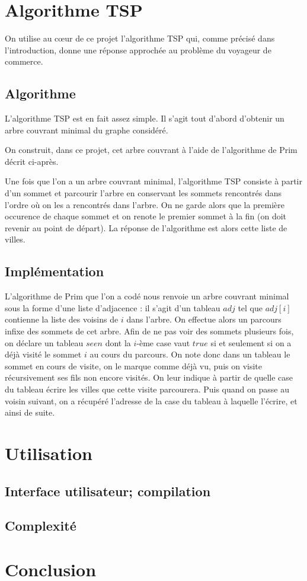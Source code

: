 \documentclass{article}
\begin{document}
\section{Algorithme TSP}
On utilise au c\oe ur de ce projet l'algorithme TSP qui, comme précisé dans l'introduction, donne une réponse approchée au problème du voyageur de commerce.

\subsection{Algorithme}
L'algorithme TSP est en fait assez simple. Il s'agit tout d'abord d'obtenir un arbre couvrant minimal du graphe considéré.


On construit, dans ce projet, cet arbre couvrant à l'aide de l'algorithme de Prim décrit ci-après.

Une fois que l'on a un arbre couvrant minimal, l'algorithme TSP consiste à partir d'un sommet et parcourir l'arbre en conservant les sommets rencontrés dans l'ordre où 
on les a rencontrés dans l'arbre. On ne garde alors que la première occurence de chaque sommet et on renote le premier sommet à la fin (on doit revenir au point de 
départ). La réponse de l'algorithme est alors cette liste de villes.

\subsection{Implémentation}
L'algorithme de Prim que l'on a codé nous renvoie un arbre couvrant minimal sous la forme d'une liste d'adjacence : il s'agit d'un tableau $adj$ tel que
$adj[i]$ contienne la liste des voisins de $i$ dans l'arbre.
On effectue alors un parcours infixe
des sommets de cet arbre. Afin de ne pas voir des sommets plusieurs fois, on déclare un tableau $seen$ dont la $i$-ème case vaut $true$ si et seulement si on a déjà
visité le sommet $i$ au cours du parcours. On note donc dans un tableau le sommet en cours de visite, on le marque comme déjà vu, puis on visite récursivement ses 
fils non encore visités. On leur indique à partir de quelle case du tableau écrire les villes que cette visite parcourera. Puis quand on passe au voisin suivant, on a
récupéré l'adresse de la case du tableau à laquelle l'écrire, et ainsi de suite.



\section{Utilisation}

\subsection{Interface utilisateur; compilation}

\subsection{Complexité}

\section*{Conclusion}



\end{document}
